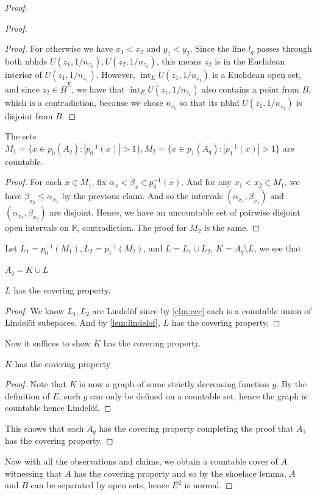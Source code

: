 \documentclass[10pt,a4paper]{amsart}
\DeclareMathOperator{\interior}{int}
\begin{document}
\begin{proof}
\begin{proof}
\begin{claim}
    \end{claim}
    \begin{proof}
        For otherwise we have $x_1<x_2$ and $y_1<y_2$. Since the line $l_q$ passes through both nbhds $U(z_1,1/n_{z_1}),U(z_2,1/n_{z_2})$, this means $z_2$ is in the Euclidean interior of $U(z_1,1/n_{z_1})$. However, $\interior_E U(z_1,1/n_{z_1})$ is a Euclidean open set, and since $z_2\in \overline{B}^{E}$, we have that $\interior_E U(z_1,1/n_{z_1})$ also contains a point from $B$, which is a contradiction, because we chose $n_{z_1}$ so that its nbhd $U(z_1,1/n_{z_1})$ is disjoint from $B$.
    \end{proof}
    \begin{claim}\label{clm:ccc}
        The sets $M_1=\{x\in p_0(A_q): |p_0^{-1}(x)|>1\}, M_2=\{x\in p_1(A_q):|p_1^{-1}(x)|>1\}$ are countable.
    \end{claim}
    \begin{proof}
         For each $x\in M_1$, fix $\alpha_x<\beta_x\in p_0^{-1}(x)$. And for any $x_1< x_2\in M_1$, we have $\beta_{x_2}\leq \alpha_{x_1}$ by the previous claim. And so the intervals $(\alpha_{x_1},\beta_{x_1})$ and $ (\alpha_{x_2},\beta_{x_2})$ are disjoint.  Hence, we have an uncountable set of pairwise disjoint open intervals on ${\mathbb R}$, contradiction.  The proof for $M_2$ is the same. 
    \end{proof}
     Let $L_1=p_0^{-1}(M_1),L_2=p_1^{-1}(M_2)$, and $L=L_1\cup L_2$, $K= A_q\setminus L$, we see that 
    \begin{simplebox}
        \begin{observation}
            $A_q= K\cup L$
        \end{observation}
    \end{simplebox}
    \begin{claim}
        $L$ has the covering property.
    \end{claim}
    \begin{proof}
        We know $L_1,L_2$ are Lindel\"of since by \ref{clm:ccc} each is a countable union of Lindel\"of subspaces. And by \ref{lem:lindelof}, $L$ has the covering property.
    \end{proof}
    Now it suffices to show $K$ has the covering property.
    \begin{claim}\label{clm:final}
        $K$ has the covering property
    \end{claim}
    \begin{proof}
        Note that $K$ is now a graph of some strictly decreasing function $g$. By the definition of $E$, such $g$ can only be defined on a countable set, hence the graph is countable hence Lindel\"of.
    \end{proof}
    This shows that each $A_q$ has the covering property completing the proof that $A_1$ has the covering property.
    \end{proof}
    
    Now with all the observations and claims, we obtain a countable cover of $A$ witnessing that $A$ has the covering property and so by the shoelace lemma, $A$ and $B$ can be separated by open sets, hence $E^2$ is normal.
\end{proof}
\end{document}
